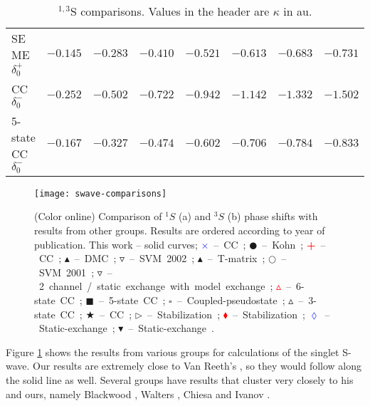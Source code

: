 \documentclass[Dissertation.tex]{subfiles}
\begin{document}
\begin{table}[H]
\begin{tabular}{l c c c c c c c}
SE ME \cite{Biswas2001} $\delta_0^+$ & $-0.145$ & $-0.283$ & $-0.410$ & $-0.521$ & $-0.613$ & $-0.683$ & $-0.731$ \\
CC \cite{Ray1997} $\delta_0^-$ & $-0.252$ & $-0.502$ & $-0.722$ & $-0.942$ & $-1.142$ & $-1.332$ & $-1.502$ \\
5-state CC \cite{Adhikari1999} $\delta_0^-$ & $-0.167$ & $-0.327$ & $-0.474$ & $-0.602$ & $-0.706$ & $-0.784$ & $-0.833$ \\
\bottomrule
\end{tabular}
\caption{$^{1,3}$S comparisons. Values in the header are $\kappa$ in au.}
\label{tab:SWaveComparisons}
\end{table}




\begin{figure}[H]
	\centering
	\texttt{[image: swave-comparisons]}
	\caption[Comparison of $^1S$ and $^3S$ phase shifts]{(Color online) Comparison of $^1S$ (a) and $^3S$ (b) phase shifts
with results from other groups. Results are ordered according to year of
publication. This work -- solid curves;
\mbox{\textcolor{blue}{$\times$} -- CC \cite{Walters2004};}
\mbox{$\CIRCLE$ -- Kohn \cite{VanReeth2003};}
\mbox{\textcolor{red}{\textbf{+}} -- CC \cite{Blackwood2002};}
\mbox{$\blacktriangle$ -- DMC \cite{Chiesa2002};} 
\mbox{$\triangledown$ -- SVM 2002 \cite{Ivanov2002};} 
\mbox{\textcolor[RGB]{0,127,0}{$\blacktriangle$} -- T-matrix \cite{Biswas2002a};} 
\mbox{$\Circle$ -- SVM 2001 \cite{Ivanov2001};} 
\mbox{\textcolor[RGB]{0,127,0}{$\triangledown$} -- 2 channel / static exchange with model exchange \cite{Biswas2001};} 
\mbox{\textcolor{red}{$\vartriangle$} -- 6-state CC \cite{Sinha2000};} 
\mbox{$\blacksquare$ -- 5-state CC \cite{Adhikari1999};} 
\mbox{$\square$ -- Coupled-pseudostate \cite{Campbell1998};} 
\mbox{$\vartriangle$ -- 3-state CC \cite{Sinha1997};} 
\mbox{\textcolor[RGB]{0,127,0}{$\bigstar$} -- CC \cite{Ray1997};} 
\mbox{$\triangleright$ -- Stabilization \cite{Drachman1976};} 
\mbox{\textcolor{red}{$\blacklozenge$} -- Stabilization \cite{Drachman1975};}
\mbox{\textcolor{blue}{$\lozenge$} -- Static-exchange \cite{Hara1975};}
\mbox{$\blacktriangledown$ -- Static-exchange \cite{Fraser1961}.}}
	\label{fig:SWaveComparisons}
\end{figure}

Figure \ref{fig:SWaveComparisons} shows the results from various groups for calculations of the singlet S-wave.  Our results are extremely close to Van Reeth's \cite{VanReeth2003}, so they would follow along the solid line as well.  Several groups have results that cluster very closely to his and ours, namely Blackwood \cite{Blackwood2002}, Walters \cite{Walters2004}, Chiesa \cite{Chiesa2002} and Ivanov \cite{Ivanov2002}.
\end{document}
